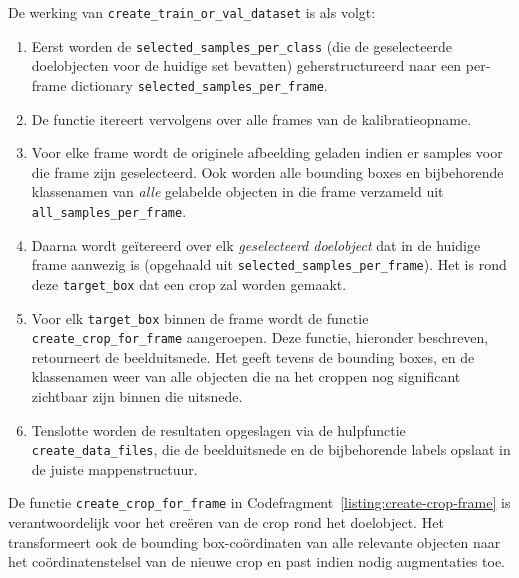 De werking van \texttt{create\_train\_or\_val\_dataset} is als volgt:
\begin{enumerate}
    \item Eerst worden de \texttt{selected\_samples\_per\_class} (die de geselecteerde doelobjecten voor de huidige set bevatten) 
    geherstructureerd naar een per-frame dictionary \texttt{selected\_samples\_per\_frame}.
    \item De functie itereert vervolgens over alle frames van de kalibratieopname.
    \item Voor elke frame wordt de originele afbeelding geladen indien er samples voor die frame zijn geselecteerd. 
    Ook worden alle bounding boxes en bijbehorende klassenamen van 
    \textit{alle} gelabelde objecten in die frame verzameld uit \texttt{all\_samples\_per\_frame}.
    \item Daarna wordt geïtereerd over elk \textit{geselecteerd doelobject}
    dat in de huidige frame aanwezig is (opgehaald uit \texttt{selected\_samples\_per\_frame}). 
    Het is rond deze \texttt{target\_box} dat een crop zal worden gemaakt.
    \item Voor elk \texttt{target\_box} binnen de frame wordt de functie \texttt{create\_crop\_for\_frame} aangeroepen. 
    Deze functie, hieronder beschreven, retourneert de beelduitsnede. Het geeft tevens de bounding boxes, en de klassenamen 
    weer van alle objecten die na het croppen nog significant zichtbaar zijn binnen die uitsnede.
    \item Tenslotte worden de resultaten opgeslagen via de hulpfunctie \texttt{create\_data\_files},
    die de beelduitsnede en de bijbehorende labels opslaat in de juiste mappenstructuur.
\end{enumerate}

De functie \texttt{create\_crop\_for\_frame} in Codefragment~\ref{listing:create-crop-frame} 
is verantwoordelijk voor het creëren van de crop rond het doelobject.
Het transformeert ook de bounding box-coördinaten van alle relevante objecten naar het coördinatenstelsel van de nieuwe crop 
en past indien nodig augmentaties toe.


